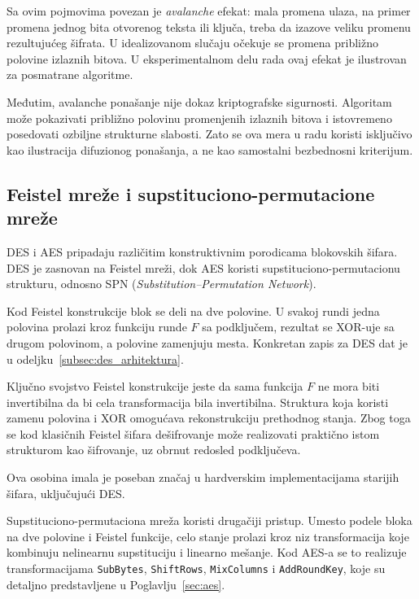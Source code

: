Sa ovim pojmovima povezan je \emph{avalanche} efekat: mala promena
ulaza, na primer promena jednog bita otvorenog teksta ili ključa, treba
da izazove veliku promenu rezultujućeg šifrata. U idealizovanom slučaju
očekuje se promena približno polovine izlaznih bitova. U eksperimentalnom
delu rada ovaj efekat je ilustrovan za posmatrane algoritme.

Međutim, avalanche ponašanje nije dokaz kriptografske sigurnosti.
Algoritam može pokazivati približno polovinu promenjenih izlaznih bitova
i istovremeno posedovati ozbiljne strukturne slabosti. Zato se ova mera
u radu koristi isključivo kao ilustracija difuzionog ponašanja, a ne kao
samostalni bezbednosni kriterijum.


\subsection{Feistel mreže i supstituciono-permutacione mreže}
\label{subsec:feistel_spn}

DES i AES pripadaju različitim konstruktivnim porodicama blokovskih
šifara. DES je zasnovan na Feistel mreži, dok AES koristi
supstituciono-permutacionu strukturu, odnosno SPN
(\emph{Substitution--Permutation Network}).

Kod Feistel konstrukcije blok se deli na dve polovine. U svakoj rundi
jedna polovina prolazi kroz funkciju runde $F$ sa podključem, rezultat se
XOR-uje sa drugom polovinom, a polovine zamenjuju mesta. Konkretan
zapis za DES dat je u odeljku~\ref{subsec:des_arhitektura}.

Ključno svojstvo Feistel konstrukcije jeste da sama funkcija $F$ ne mora
biti invertibilna da bi cela transformacija bila invertibilna. Struktura
koja koristi zamenu polovina i XOR omogućava rekonstrukciju prethodnog
stanja. Zbog toga se kod klasičnih Feistel šifara dešifrovanje može
realizovati praktično istom strukturom kao šifrovanje, uz obrnut redosled
podključeva.

Ova osobina imala je poseban značaj u hardverskim implementacijama
starijih šifara, uključujući DES.

Supstituciono-permutaciona mreža koristi drugačiji pristup. Umesto
podele bloka na dve polovine i Feistel funkcije, celo stanje prolazi
kroz niz transformacija koje kombinuju nelinearnu supstituciju i
linearno mešanje. Kod AES-a se to realizuje transformacijama
\texttt{SubBytes}, \texttt{ShiftRows}, \texttt{MixColumns} i
\texttt{AddRoundKey}, koje su detaljno predstavljene u
Poglavlju~\ref{sec:aes}.

